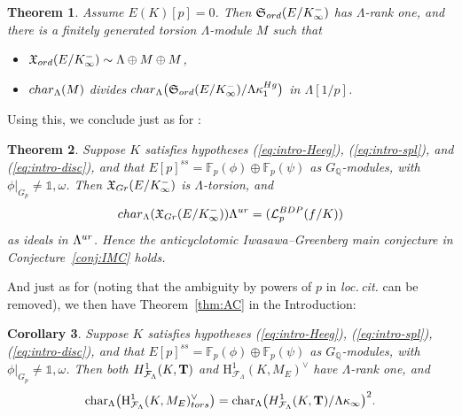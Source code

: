 \documentclass[a4paper,10pt]{amsart}
\numberwithin{equation}{section}
\numberwithin{equation}{section}
\theoremstyle{plain}
\newtheorem{thm}{Theorem}[subsection] %
\theoremstyle{definition}
\theoremstyle{definition}
\theoremstyle{plain}
\theoremstyle{plain}
\theoremstyle{plain}
\newtheorem{cor}[thm]{Corollary}
\theoremstyle{plain}
\newcommand{\bQ}{\mathbb{Q}}
\newcommand{\X}{\mathfrak{X}}
\newcommand{\Lcal}{\mathcal{L}}
\newcommand{\Fcal}{\mathcal{F}}
\newcommand{\rH}{\mathrm{H}}
\begin{document}
\begin{thm}\label{thm:howard-HP}
Assume $E(K)[p]=0$. Then $\mathfrak{S}_{\rm ord}(E/K_\infty^-)$ has $\Lambda$-rank one, and there is a finitely generated torsion $\Lambda$-module $M$ such that
\begin{itemize}
\item[(i)] $\X_{\rm ord}(E/K_\infty^-)\sim\Lambda\oplus M\oplus M$,
\item[(ii)] ${\rm char}_\Lambda(M)$ divides ${\rm char}_\Lambda\bigl(\mathfrak{S}_{\rm ord}(E/K_\infty^-)/\Lambda\kappa_1^{\rm Hg}\bigr)$ in $\Lambda[1/p]$.
\end{itemize}
\end{thm}

Using this, 
we conclude just as for \cite[Thm.~4.2.2]{eisenstein}:

\begin{thm}\label{thm:BDP-IMC}
Suppose $K$ satisfies hypotheses {\rm (\ref{eq:intro-Heeg})}, {\rm (\ref{eq:intro-spl})}, and {\rm (\ref{eq:intro-disc})}, and that
$E[p]^{ss}=\mathbb{F}_p(\phi)\oplus\mathbb{F}_p(\psi)$ as $G_\bQ$-modules, with $\phi\vert_{G_p}\neq\mathds{1},\omega$.
Then $\X_{\rm Gr}(E/K_\infty^-)$ is $\Lambda$-torsion, and
\[
{\rm char}_\Lambda(\X_{\rm Gr}(E/K_\infty^-))\Lambda^{\rm ur}=(\Lcal_p^{\rm BDP}(f/K))
\]
as ideals in $\Lambda^{\rm ur}$. Hence the anticyclotomic Iwasawa--Greenberg main conjecture in Conjecture~\ref{conj:IMC} holds.
\end{thm}

And just as for \cite[Cor.~4.2.3]{eisenstein} (noting that the ambiguity by powers of $p$ in \emph{loc.\,cit.} can be removed), we then have Theorem~\ref{thm:AC} in the Introduction:

\begin{cor}\label{cor:PR} 
Suppose $K$ satisfies hypotheses {\rm (\ref{eq:intro-Heeg})}, {\rm (\ref{eq:intro-spl})},  {\rm (\ref{eq:intro-disc})}, and that $E[p]^{ss}=\mathbb{F}_p(\phi)\oplus\mathbb{F}_p(\psi)$ as $G_\bQ$-modules, with $\phi\vert_{G_p}\neq\mathds{1},\omega$. 
Then both ${\rm H}^1_{\Fcal_\Lambda}(K,\mathbf{T})$ and 
$\rH^1_{\Fcal_\Lambda}(K,M_E)^\vee$ have $\Lambda$-rank one, and
\[
\mathrm{char}_\Lambda\bigl(\rH^1_{\Fcal_\Lambda}(K,M_E)^\vee_{\rm tors}\bigr)=\mathrm{char}_\Lambda\bigl({\rm H}^1_{\Fcal_\Lambda}(K,\mathbf{T})/\Lambda\kappa_\infty\bigr)^2.
\]
\end{cor}
 
\end{document}
